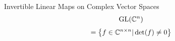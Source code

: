 %    
%    
%

\begin{frame}{Invertible Linear Maps on Complex Vector Spaces}
    \huge
    \begin{align*}
        \operatorname{GL}(\mathbb{C}^n)
    \end{align*}
    \pause
    \large
    \begin{align*}
        = \left\{
            f \in \mathbb{C}^{n \times n} | \det(f) \neq 0
        \right\}
    \end{align*}

\end{frame}
